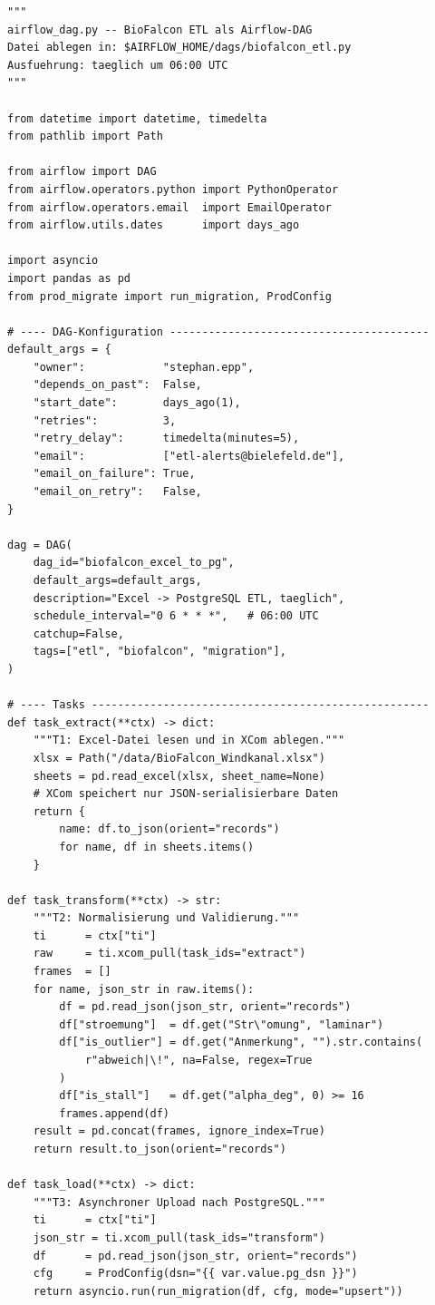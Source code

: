 ﻿\documentclass[12pt,a4paper]{report}
\theoremstyle{definition}
\theoremstyle{remark}
\begin{document}
\begin{lstlisting}[style=python, caption={airflow\_dag.py: ETL-Pipeline als Airflow-DAG}, label=lst:airflow]
"""
airflow_dag.py -- BioFalcon ETL als Airflow-DAG
Datei ablegen in: $AIRFLOW_HOME/dags/biofalcon_etl.py
Ausfuehrung: taeglich um 06:00 UTC
"""

from datetime import datetime, timedelta
from pathlib import Path

from airflow import DAG
from airflow.operators.python import PythonOperator
from airflow.operators.email  import EmailOperator
from airflow.utils.dates      import days_ago

import asyncio
import pandas as pd
from prod_migrate import run_migration, ProdConfig

# ---- DAG-Konfiguration ----------------------------------------
default_args = {
    "owner":            "stephan.epp",
    "depends_on_past":  False,
    "start_date":       days_ago(1),
    "retries":          3,
    "retry_delay":      timedelta(minutes=5),
    "email":            ["etl-alerts@bielefeld.de"],
    "email_on_failure": True,
    "email_on_retry":   False,
}

dag = DAG(
    dag_id="biofalcon_excel_to_pg",
    default_args=default_args,
    description="Excel -> PostgreSQL ETL, taeglich",
    schedule_interval="0 6 * * *",   # 06:00 UTC
    catchup=False,
    tags=["etl", "biofalcon", "migration"],
)

# ---- Tasks ----------------------------------------------------
def task_extract(**ctx) -> dict:
    """T1: Excel-Datei lesen und in XCom ablegen."""
    xlsx = Path("/data/BioFalcon_Windkanal.xlsx")
    sheets = pd.read_excel(xlsx, sheet_name=None)
    # XCom speichert nur JSON-serialisierbare Daten
    return {
        name: df.to_json(orient="records")
        for name, df in sheets.items()
    }

def task_transform(**ctx) -> str:
    """T2: Normalisierung und Validierung."""
    ti      = ctx["ti"]
    raw     = ti.xcom_pull(task_ids="extract")
    frames  = []
    for name, json_str in raw.items():
        df = pd.read_json(json_str, orient="records")
        df["stroemung"]  = df.get("Str\"omung", "laminar")
        df["is_outlier"] = df.get("Anmerkung", "").str.contains(
            r"abweich|\!", na=False, regex=True
        )
        df["is_stall"]   = df.get("alpha_deg", 0) >= 16
        frames.append(df)
    result = pd.concat(frames, ignore_index=True)
    return result.to_json(orient="records")

def task_load(**ctx) -> dict:
    """T3: Asynchroner Upload nach PostgreSQL."""
    ti      = ctx["ti"]
    json_str = ti.xcom_pull(task_ids="transform")
    df      = pd.read_json(json_str, orient="records")
    cfg     = ProdConfig(dsn="{{ var.value.pg_dsn }}")
    return asyncio.run(run_migration(df, cfg, mode="upsert"))


\end{lstlisting}
\end{document}
